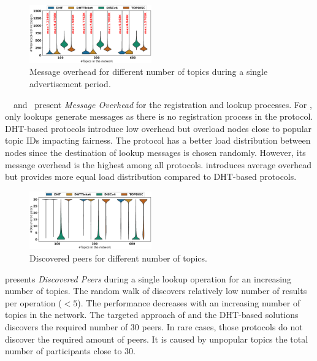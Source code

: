 	
\begin{figure}
\centering
\includegraphics[width=0.470\textwidth]{results/no_split/violin_topic_totalMsg.eps}
\caption{Message overhead for different number of topics during a single advertisement period.}
\label{fig:msgsPerTopic}
\vspace{-0.15in}
\end{figure}

~~and~ present \emph{Message Overhead} for the registration and lookup processes. For \discv, only lookups generate messages as there is no registration process in the protocol.
DHT-based protocols introduce low overhead but overload nodes close to popular topic IDs impacting fairness.
The \discv protocol has a better load distribution between nodes since the destination of lookup messages is chosen randomly. However, its message overhead is the highest among all protocols. 
\sysname introduces average overhead but provides more equal load distribution compared to DHT-based protocols.


\begin{figure}[!h]
\includegraphics[width=0.470\textwidth]{results/no_split/violin_topic_discovered.eps}
\vspace{-0.05in}
\caption{Discovered peers for different number of topics.}
\label{fig:discoveredPerTopic}
\end{figure}

 presents \emph{Discovered Peers} during a single lookup operation for an increasing number of topics. The random walk of \discv discovers relatively low number of results per operation ($< 5$). The performance decreases with an increasing number of topics in the network. The targeted approach of \sysname and the DHT-based solutions discovers the required number of 30 peers. In rare cases, those protocols do not discover the required amount of peers. It is caused by unpopular topics the total number of participants close to 30. 

